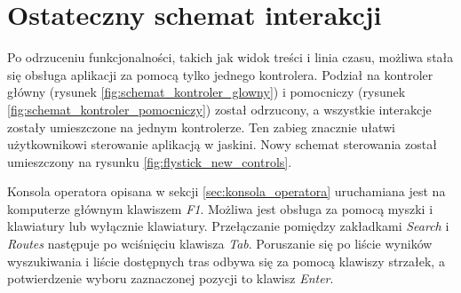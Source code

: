 \section{Ostateczny schemat interakcji}
\label{sec:schemat_interakcji}
Po odrzuceniu funkcjonalności, takich jak widok treści i linia czasu, możliwa stała się obsługa aplikacji za pomocą tylko jednego kontrolera. Podział na kontroler główny (rysunek \ref{fig:schemat_kontroler_glowny}) i pomocniczy (rysunek \ref{fig:schemat_kontroler_pomocniczy}) został odrzucony, a wszystkie interakcje zostały umieszczone na jednym kontrolerze. Ten zabieg znacznie ułatwi użytkownikowi sterowanie aplikacją w jaskini. Nowy schemat sterowania został umieszczony na rysunku \ref{fig:flystick_new_controls}.


Konsola operatora opisana w sekcji \ref{sec:konsola_operatora} uruchamiana jest na komputerze głównym klawiszem \textit{F1}. Możliwa jest obsługa za pomocą myszki i klawiatury lub wyłącznie klawiatury. Przełączanie pomiędzy zakładkami \textit{Search} i \textit{Routes} następuje po wciśnięciu klawisza \textit{Tab}. Poruszanie się po liście wyników wyszukiwania i liście dostępnych tras odbywa się za pomocą klawiszy strzałek, a potwierdzenie wyboru zaznaczonej pozycji to klawisz \textit{Enter}.